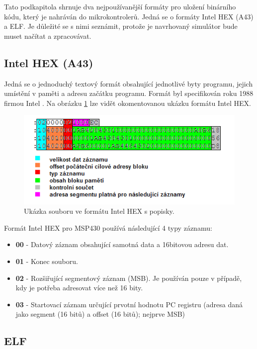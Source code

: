 Tato podkapitola shrnuje dva nejpoužívanější formáty pro uložení binárního kódu, který je nahráván do mikrokontrolerů. Jedná se o formáty Intel HEX (A43) a ELF. Je důležité se s nimi seznámit, protože je navrhovaný simulátor bude muset načítat a zpracovávat.

\subsection{Intel HEX (A43)}

Jedná se o jednoduchý textový formát obsahující jednotlivé byty programu, jejich umístění v paměti a adresu začátku programu. Formát byl specifikován roku 1988 firmou Intel \cite{intelhex}. Na obrázku \ref{fig:intelhex} lze vidět okomentovanou ukázku formátu Intel HEX.

\begin{figure}[ht]
\centering
\includegraphics[trim=0cm 0cm 0cm 0cm, scale=0.7]{fig/intelhex}
\caption{Ukázka souboru ve formátu Intel HEX s popisky.}
\label{fig:intelhex}
\end{figure}

Formát Intel HEX pro MSP430 používá následující 4 typy záznamu:

\begin{itemize}
\item \textbf{00} - Datový záznam obsahující samotná data a 16bitovou adresu dat.
\item \textbf{01} - Konec souboru.
\item \textbf{02} - Rozšiřující segmentový záznam (MSB). Je používán pouze v případě, kdy je potřeba adresovat více než 16 bity.
\item \textbf{03} - Startovací záznam určující prvotní hodnotu PC registru (adresa daná jako segment (16 bitů) a offset (16 bitů); nejprve MSB)
\end{itemize}

\subsection{ELF}

